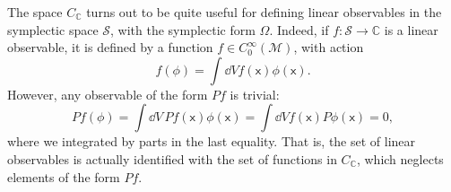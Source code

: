 \documentclass[letterpaper,12pt,titlepage,oneside,final]{book}
\newcommand{\M}{\mathcal{M}}
\renewcommand{\S}{\mathcal{S}}
\newcommand{\mf}{\mathsf}%
\begin{document}


The space $C_\mathbb{C}$ turns out to be quite useful for defining linear observables in the symplectic space $\S$, with the symplectic form $\Omega$. Indeed, if $f:\mathcal{S}\to \mathbb{C}$ is a linear observable, it is defined by a function $f\in C_0^\infty(\M)$, with action
\begin{equation}
    f(\phi) = \int \dd V f(\mf x) \phi(\mf x).
\end{equation}
However, any observable of the form $Pf$ is trivial:
\begin{equation}
    Pf(\phi) = \int \dd V\, Pf(\mf x) \phi(\mf x) = \int \dd V f(\mf x) P\phi(\mf x) = 0,
\end{equation}
where we integrated by parts in the last equality. That is, the set of linear observables is actually identified with the set of functions in $C_\mathbb{C}$, which neglects elements of the form $Pf$. 

\end{document}
